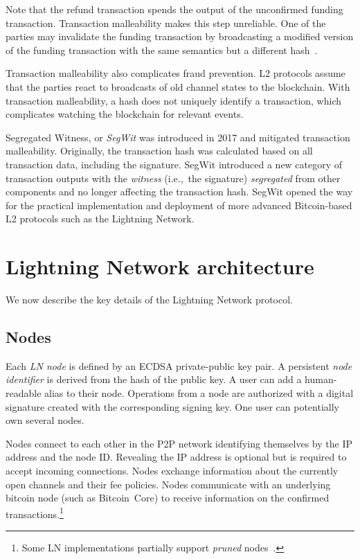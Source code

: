 Note that the refund transaction spends the output of the unconfirmed funding transaction.
Transaction malleability makes this step unreliable.
One of the parties may invalidate the funding transaction by broadcasting a modified version of the funding transaction with the same semantics but a different hash~\cite{Harding2016}.

Transaction malleability also complicates fraud prevention.
L2 protocols assume that the parties react to broadcasts of old channel states to the blockchain.
With transaction malleability, a hash does not uniquely identify a transaction, which complicates watching the blockchain for relevant events.

Segregated Witness, or \textit{SegWit} was introduced in 2017 and mitigated transaction malleability.
Originally, the transaction hash was calculated based on all transaction data, including the signature.
SegWit introduced a new category of transaction outputs with the \textit{witness} (i.e.,~the signature) \textit{segregated} from other components and no longer affecting the transaction hash.
SegWit opened the way for the practical implementation and deployment of more advanced Bitcoin-based L2 protocols such as the Lightning Network.


\section{Lightning Network architecture}
\label{sec:LightningOverview}

We now describe the key details of the Lightning Network protocol.

\subsection{Nodes}

Each \textit{LN node} is defined by an ECDSA private-public key pair.
A persistent \textit{node identifier} is derived from the hash of the public key. 
A user can add a human-readable alias to their node.
Operations from a node are authorized with a digital signature created with the corresponding signing key.
One user can potentially own several nodes.

Nodes connect to each other in the P2P network identifying themselves by the IP address and the node ID\@.
Revealing the IP address is optional but is required to accept incoming connections.
Nodes exchange information about the currently open channels and their fee policies.
Nodes communicate with an underlying bitcoin node (such as Bitcoin~Core) to receive information on the confirmed transactions.\footnote{Some LN implementations partially support \textit{pruned} nodes~\cite{LNDInstall}.}


